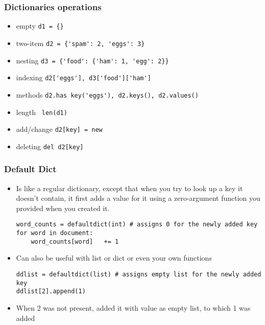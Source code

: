 \begin{frame}[fragile]\frametitle{Dictionaries operations}
  \begin{itemize}
  \item empty  \lstinline|d1 = {}|
  \item two-item \lstinline|d2 = {'spam': 2, 'eggs': 3}|
  \item nesting \lstinline|d3 = {'food': {'ham': 1, 'egg': 2}}|
  \item indexing \lstinline|d2['eggs'], d3['food']['ham']|
  \item methods \lstinline|d2.has key('eggs'), d2.keys(), d2.values()|
  \item length \lstinline| len(d1)|
  \item add/change \lstinline|d2[key] = new|
  \item deleting \lstinline|del d2[key]|
  \end{itemize}
\end{frame}

\begin{frame}[fragile]\frametitle{Default Dict}
  \begin{itemize}
  \item Is like a regular dictionary, except that when you try	to look up a key it doesn't	contain, it first adds a value for it using a zero-argument function you provided when you created it.	
  \begin{lstlisting}
word_counts = defaultdict(int) # assigns 0 for the newly added key
for word in document:
	word_counts[word]	+= 1
  \end{lstlisting}
\item Can also be useful with list	or dict	or even your	own functions
  \begin{lstlisting}
ddlist = defaultdict(list) # assigns empty list for the newly added key
ddlist[2].append(1) 
  \end{lstlisting}
\item When 2 was not present, added it with value as empty list, to which 1 was added
  \end{itemize}
\end{frame}


